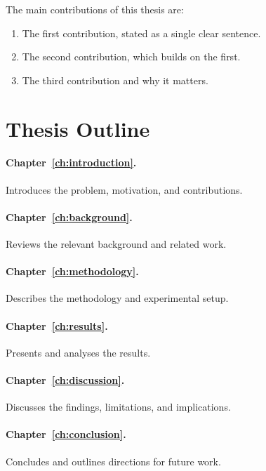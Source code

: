 The main contributions of this thesis are:
\begin{enumerate}
    \item The first contribution, stated as a single clear sentence.
    \item The second contribution, which builds on the first.
    \item The third contribution and why it matters.
\end{enumerate}

\section{Thesis Outline}
\label{sec:outline}

\paragraph{Chapter~\ref{ch:introduction}.} Introduces the problem, motivation, and contributions.

\paragraph{Chapter~\ref{ch:background}.} Reviews the relevant background and related work.

\paragraph{Chapter~\ref{ch:methodology}.} Describes the methodology and experimental setup.

\paragraph{Chapter~\ref{ch:results}.} Presents and analyses the results.

\paragraph{Chapter~\ref{ch:discussion}.} Discusses the findings, limitations, and implications.

\paragraph{Chapter~\ref{ch:conclusion}.} Concludes and outlines directions for future work.
